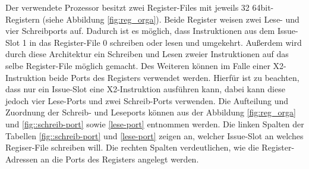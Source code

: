 %			
Der verwendete Prozessor besitzt zwei Register-Files mit jeweils 32 64bit-Registern (siehe Abbildung \ref{fig:reg_orga}). Beide Register weisen zwei Lese- und vier Schreibports auf. Dadurch ist es möglich, dass Instruktionen aus dem Issue-Slot 1 in das Register-File 0 schreiben oder lesen und umgekehrt. Außerdem wird durch diese Architektur ein Schreiben und Lesen zweier Instruktionen auf das selbe Register-File möglich gemacht. Des Weiteren können im Falle einer X2-Instruktion beide Ports des Registers verwendet werden. Hierfür ist zu beachten, dass nur ein Issue-Slot eine X2-Instruktion ausführen kann, dabei kann diese jedoch vier Lese-Ports und zwei Schreib-Ports verwenden. \cite{paya2010multi} Die Aufteilung und  Zuordnung der Schreib- und Leseports können aus der Abbildung \ref{fig:reg_orga} und \ref{fig::schreib-port} sowie \ref{lese-port} entnommen werden. Die linken Spalten der Tabellen \ref{fig::schreib-port} und \ref{lese-port} zeigen an, welcher Issue-Slot an welches Regiser-File schreiben will. Die rechten Spalten verdeutlichen, wie die Register-Adressen an die Ports des Registers angelegt werden.

